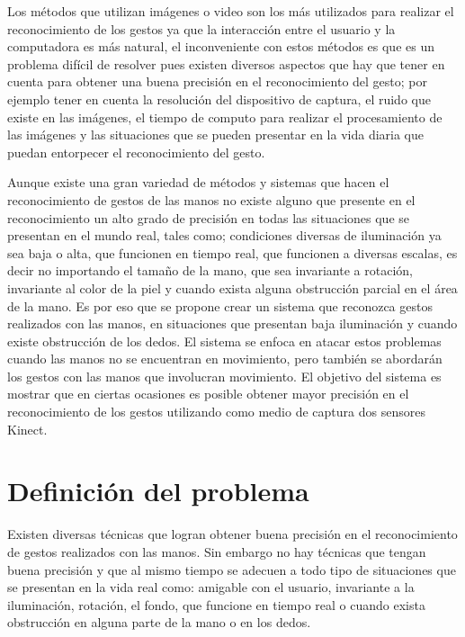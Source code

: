 Los métodos que utilizan imágenes o video son los más utilizados para realizar el reconocimiento de los gestos ya que la interacción entre el usuario y la computadora es más natural, el inconveniente con estos métodos es que es un problema difícil de resolver pues existen diversos aspectos que hay que tener en cuenta para obtener una buena precisión en el reconocimiento del gesto; por ejemplo tener en cuenta la resolución del dispositivo de captura, el ruido que existe en las imágenes, el tiempo de computo para realizar el procesamiento de las imágenes y las situaciones que se pueden presentar en la vida diaria que puedan entorpecer el reconocimiento del gesto. 

Aunque existe una gran variedad de métodos y sistemas que hacen el reconocimiento de gestos de las manos no existe alguno que presente en el reconocimiento un alto grado de precisión en todas las situaciones que se presentan en el mundo real, tales como; condiciones diversas de iluminación ya sea baja o alta, que funcionen en tiempo real, que funcionen a diversas escalas, es decir no importando el tamaño de la mano, que sea invariante a rotación, invariante al color de la piel y cuando exista alguna obstrucción parcial en el área de la mano.
Es por eso que se propone crear un sistema que reconozca gestos realizados con las manos, en situaciones que presentan baja iluminación y cuando existe obstrucción de los dedos. 
El sistema se enfoca en atacar estos problemas cuando las manos no se encuentran en movimiento, pero también se abordar\'an los gestos con las manos que involucran movimiento. El objetivo del sistema es mostrar que en ciertas ocasiones es posible obtener mayor precisión en el reconocimiento de los gestos utilizando como medio de captura dos sensores Kinect.   




\section{Definici\'on del problema}\label{sec:DefinicionProblema}

Existen diversas técnicas que logran obtener buena precisión en el reconocimiento de gestos realizados con las manos. Sin embargo no hay técnicas que tengan buena precisión y que al mismo tiempo se adecuen a todo tipo de situaciones que se presentan en la vida real como: amigable con el usuario, invariante a la iluminación, rotación, el fondo, que funcione en tiempo real o cuando exista obstrucción en alguna parte de la mano o en los dedos.


